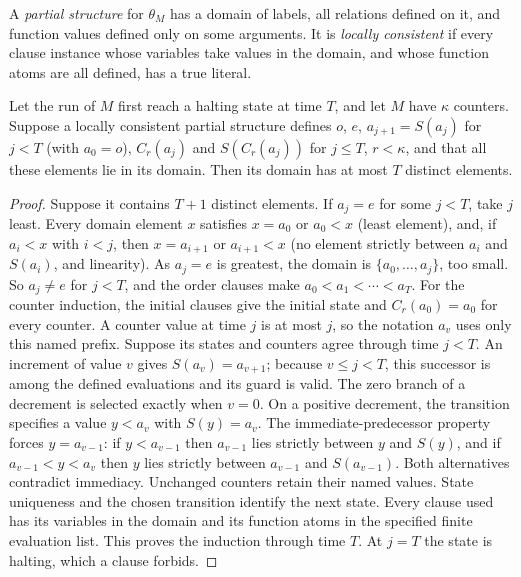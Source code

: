 A \emph{partial structure} for $\theta_M$ has a domain of labels, all relations defined on it, and
function values defined only on some arguments. It is \emph{locally consistent} if every clause
instance whose variables take values in the domain, and whose function atoms are all defined,
has a true literal.

\begin{lemma}\label{lem:local-switch}
Let the run of $M$ first reach a halting state at time $T$, and let $M$ have $\kappa$ counters.
Suppose a locally consistent partial structure defines $o$, $e$, $a_{j+1}=S(a_j)$ for $j<T$
\textup{(}with $a_0=o$\textup{)}, $C_r(a_j)$ and $S(C_r(a_j))$ for $j\le T$, $r<\kappa$, and that all these
elements lie in its domain. Then its domain has at most $T$ distinct elements.
\end{lemma}
\begin{proof}
Suppose it contains $T+1$ distinct elements. If $a_j=e$ for some $j<T$, take $j$ least. Every
domain element $x$ satisfies $x=a_0$ or $a_0<x$ (least element), and, if $a_i<x$ with $i<j$, then
$x=a_{i+1}$ or $a_{i+1}<x$ (no element strictly between $a_i$ and $S(a_i)$, and linearity). As
$a_j=e$ is greatest, the domain is $\{a_0,\ldots,a_j\}$, too small. So $a_j\ne e$ for $j<T$, and
the order clauses make $a_0<a_1<\cdots<a_T$. For the counter induction, the initial clauses give the initial
state and $C_r(a_0)=a_0$ for every counter. A counter value at time $j$
is at most $j$, so the notation $a_v$ uses only this named prefix.
Suppose its states and counters agree through time $j<T$.
An increment of value $v$ gives $S(a_v)=a_{v+1}$; because $v\le j<T$,
this successor is among the defined evaluations and its guard is valid.
The zero branch of a decrement is selected exactly when $v=0$.
On a positive decrement, the transition specifies a value $y<a_v$
with $S(y)=a_v$. The immediate-predecessor property forces
$y=a_{v-1}$: if $y<a_{v-1}$ then $a_{v-1}$ lies strictly between
$y$ and $S(y)$, and if $a_{v-1}<y<a_v$ then $y$ lies strictly
between $a_{v-1}$ and $S(a_{v-1})$. Both alternatives contradict
immediacy. Unchanged counters retain their named values. State
uniqueness and the chosen transition identify the next state.
Every clause used has its variables in the domain and its function
atoms in the specified finite evaluation list. This proves the
induction through time $T$. At $j=T$ the state is halting, which a clause forbids.
\end{proof}

